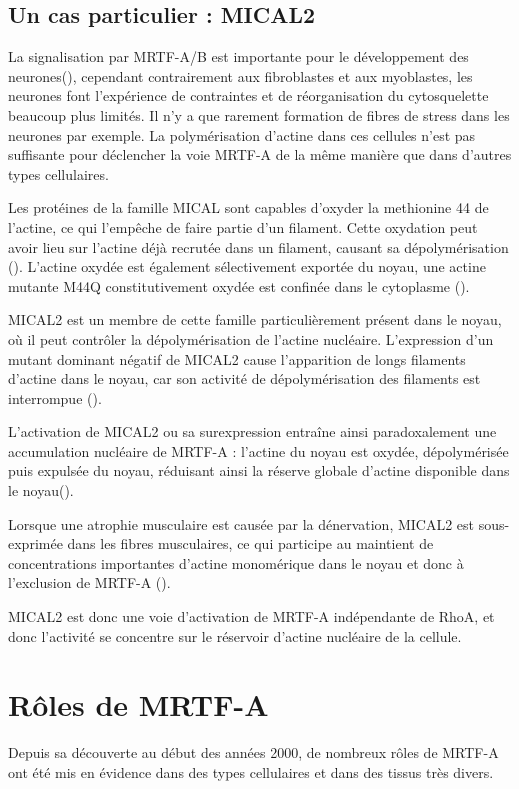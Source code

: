 \subsection{Un cas particulier : MICAL2}

La signalisation par MRTF-A/B est importante pour le développement des neurones(\cite{kalita_mkls:_2012}), cependant contrairement aux fibroblastes et aux myoblastes, les neurones font l'expérience de contraintes et de réorganisation du cytosquelette beaucoup plus limités. Il n'y a que rarement formation de fibres de stress dans les neurones par exemple. La polymérisation d'actine dans ces cellules n'est pas suffisante pour déclencher la voie MRTF-A de la même manière que dans d'autres types cellulaires. 

Les protéines de la famille MICAL sont capables d'oxyder la methionine 44 de l'actine, ce qui l'empêche de faire partie d'un filament. Cette oxydation peut avoir lieu sur l'actine déjà recrutée dans un filament, causant sa dépolymérisation (\cite{hung_direct_2011}). L'actine oxydée est également sélectivement exportée du noyau, une actine mutante M44Q constitutivement oxydée est confinée dans le cytoplasme (\cite{lundquist_redox_2014}).

MICAL2 est un membre de cette famille particulièrement présent dans le noyau, où il peut contrôler la dépolymérisation de l'actine nucléaire. L'expression d'un mutant dominant négatif de MICAL2 cause l'apparition de longs filaments d'actine dans le noyau, car son activité de dépolymérisation des filaments est interrompue (\cite{lundquist_redox_2014}). 

L'activation de MICAL2 ou sa surexpression entraîne ainsi paradoxalement une accumulation nucléaire de MRTF-A : l'actine du noyau est oxydée, dépolymérisée puis expulsée du noyau, réduisant ainsi la réserve globale d'actine disponible dans le noyau(\cite{lundquist_redox_2014}). 

Lorsque une atrophie musculaire est causée par la dénervation, MICAL2 est sous-exprimée dans les fibres musculaires, ce qui participe au maintient de concentrations importantes d'actine monomérique dans le noyau et donc à l'exclusion de MRTF-A (\cite{collard_nuclear_2014}). 

MICAL2 est donc une voie d'activation de MRTF-A indépendante de RhoA, et donc l'activité se concentre sur le réservoir d'actine nucléaire de la cellule. 



\section{Rôles de MRTF-A}
Depuis sa découverte au début des années 2000, de nombreux rôles de MRTF-A ont été mis en évidence dans des types cellulaires et dans des tissus très divers. 
